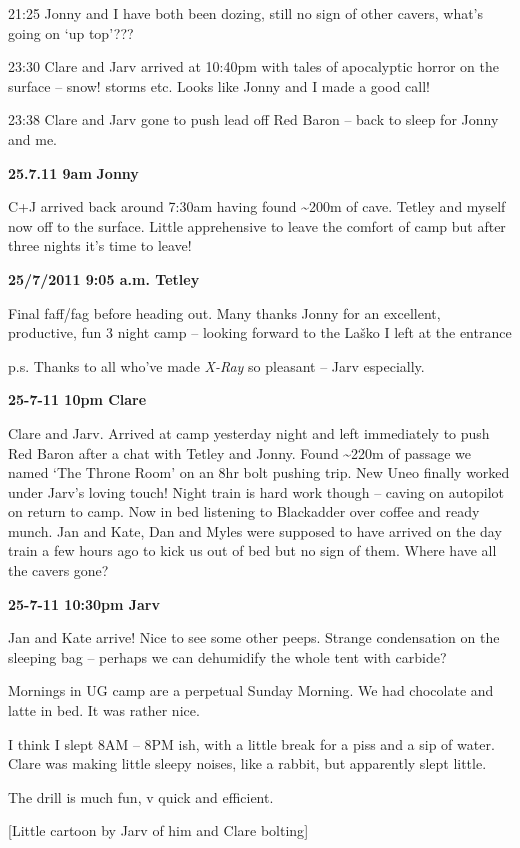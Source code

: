 21:25 Jonny and I have both been dozing, still no sign of other cavers,
what's going on `up top'???

23:30 Clare and Jarv arrived at 10:40pm with tales of apocalyptic horror
on the surface -- snow! storms etc. Looks like Jonny and I made a good
call!

23:38 Clare and Jarv gone to push lead off Red Baron -- back to sleep
for Jonny and me.

\textbf{25.7.11 9am} \textbf{Jonny}

C+J arrived back around 7:30am having found \textasciitilde{}200m of
cave. Tetley and myself now off to the surface. Little apprehensive to
leave the comfort of camp but after three nights it's time to leave!

\textbf{25/7/2011 9:05 a.m. Tetley}

Final faff/fag before heading out. Many thanks Jonny for an excellent,
productive, fun 3 night camp -- looking forward to the Laško I left at
the entrance

p.s. Thanks to all who've made \emph{X-Ray} so pleasant -- Jarv
especially.

\textbf{25-7-11 10pm Clare}

Clare and Jarv. Arrived at camp yesterday night and left immediately to
push Red Baron after a chat with Tetley and Jonny. Found
\textasciitilde{}220m of passage we named `The Throne Room' on an 8hr
bolt pushing trip. New Uneo finally worked under Jarv's loving touch!
Night train is hard work though -- caving on autopilot on return to
camp. Now in bed listening to Blackadder over coffee and ready munch.
Jan and Kate, Dan and Myles were supposed to have arrived on the day
train a few hours ago to kick us out of bed but no sign of them. Where
have all the cavers gone?

\textbf{25-7-11 10:30pm Jarv}

Jan and Kate arrive! Nice to see some other peeps. Strange condensation
on the sleeping bag -- perhaps we can dehumidify the whole tent with
carbide?

Mornings in UG camp are a perpetual Sunday Morning. We had chocolate and
latte in bed. It was rather nice.

I think I slept 8AM -- 8PM ish, with a little break for a piss and a sip
of water. Clare was making little sleepy noises, like a rabbit, but
apparently slept little.

The drill is much fun, v quick and efficient.

{[}Little cartoon by Jarv of him and Clare bolting{]}

